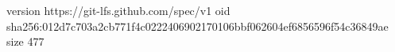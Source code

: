 version https://git-lfs.github.com/spec/v1
oid sha256:012d7c703a2cb771f4c0222406902170106bbf062604ef6856596f54c36849ae
size 477

